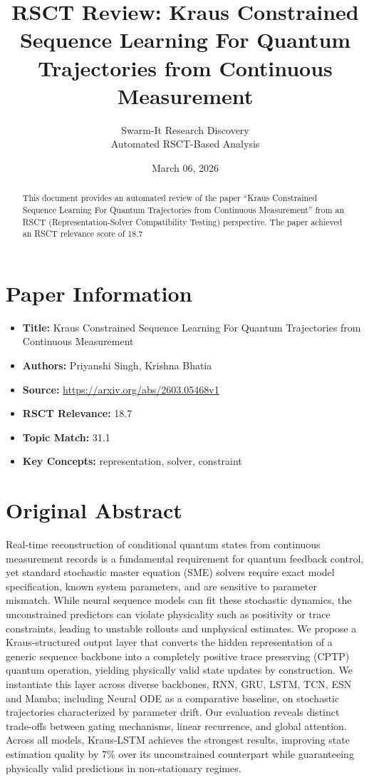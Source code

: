 \documentclass[11pt,a4paper]{article}
\title{RSCT Review: Kraus Constrained Sequence Learning For Quantum Trajectories from Continuous Measurement}
\author{Swarm-It Research Discovery\\\small Automated RSCT-Based Analysis}
\date{March 06, 2026}
\begin{document}
\maketitle

\begin{abstract}
This document provides an automated review of the paper ``Kraus Constrained Sequence Learning For Quantum Trajectories from Continuous Measurement'' from an RSCT (Representation-Solver Compatibility Testing) perspective. The paper achieved an RSCT relevance score of 18.7%
\end{abstract}

\section{Paper Information}
\begin{itemize}
\item \textbf{Title:} Kraus Constrained Sequence Learning For Quantum Trajectories from Continuous Measurement
\item \textbf{Authors:} Priyanshi Singh, Krishna Bhatia
\item \textbf{Source:} \url{https://arxiv.org/abs/2603.05468v1}
\item \textbf{RSCT Relevance:} 18.7%
\item \textbf{Topic Match:} 31.1%
\item \textbf{Key Concepts:} representation, solver, constraint
\end{itemize}

\section{Original Abstract}
Real-time reconstruction of conditional quantum states from continuous measurement records is a fundamental requirement for quantum feedback control, yet standard stochastic master equation (SME) solvers require exact model specification, known system parameters, and are sensitive to parameter mismatch. While neural sequence models can fit these stochastic dynamics, the unconstrained predictors can violate physicality such as positivity or trace constraints, leading to unstable rollouts and unphysical estimates. We propose a Kraus-structured output layer that converts the hidden representation of a generic sequence backbone into a completely positive trace preserving (CPTP) quantum operation, yielding physically valid state updates by construction. We instantiate this layer across diverse backbones, RNN, GRU, LSTM, TCN, ESN and Mamba; including Neural ODE as a comparative baseline, on stochastic trajectories characterized by parameter drift. Our evaluation reveals distinct trade-offs between gating mechanisms, linear recurrence, and global attention. Across all models, Kraus-LSTM achieves the strongest results, improving state estimation quality by 7\% over its unconstrained counterpart while guaranteeing physically valid predictions in non-stationary regimes.
\end{document}
